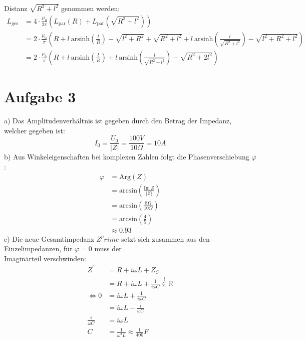 \documentclass[11pt a4paper]{article}
\newcommand{\arsinh}{\text{arsinh}}
\begin{document}
Distanz $\sqrt{R^2 + l^2}$ genommen werden:
\begin{align*}
	L_\text{ges} 
	&= 4 \cdot \frac{\mu_0}{2\pi}
		\left( L_\text{par} (R) + L_\text{par} \left( \sqrt{R^2 + l^2} \right) \right) \\
	&= 2 \cdot \frac{\mu_0}{\pi} \left( 
			R + l \ \arsinh \left(\frac{l}{R} \right) - \sqrt{l^2 + R^2} + 
			\sqrt{R^2 + l^2} + l \ \arsinh \left(\frac{l}{\sqrt{R^2 + l^2}} \right) 
			- \sqrt{l^2 + R^2 + l^2}
		\right) \\
	&= 2 \cdot \frac{\mu_0}{\pi} \left( 
			R + l \ \arsinh \left(\frac{l}{R} \right)
			  + l \ \arsinh \left(\frac{l}{\sqrt{R^2 + l^2}} \right) 
			- \sqrt{R^2 + 2l^2}
		\right)
\end{align*}

\newpage
\section*{Aufgabe 3}
a) Das Amplitudenverhältnis ist gegeben durch den Betrag der Impedanz, welcher gegeben ist:
\[ I_0 = \frac{U_0}{\vert Z \vert} = \frac{100V}{10\Omega} = 10 A \]
%
\vspace{0.5cm}
b) Aus Winkeleigenschaften bei komplexen Zahlen folgt die Phasenverschiebung $\varphi$:
\begin{align*}
	\varphi 
	&= \text{Arg} (Z) \\
	&= \text{arcsin} \left( \frac{ \text{Im} \ Z}{\vert Z \vert} \right) \\
	&= \text{arcsin} \left( \frac{8\Omega}{10\Omega} \right) \\
	&= \text{arcsin} \left( \frac45 \right) \\
	&\approx 0.93
\end{align*}
\vspace{0.5cm}
c) Die neue Gesamtimpedanz $Z^prime$ setzt sich zusammen aus den Einzelimpedanzen, für $\varphi = 0$ muss 
der \\ Imaginärteil verschwinden:
\begin{align*}
	Z^\prime
	&= R + i\omega L + Z_C \\
	&= R + i\omega L + \frac1{i\omega C} \overset{!}{\in} \mathbb{R} \\
	\Leftrightarrow
	0
	&= i\omega L + \frac1{i\omega C} \\
	&= i\omega L - \frac{i}{\omega C} \\
	\frac{i}{\omega C}
	&= i\omega L \\
	C 
	&= \frac{1}{\omega^2 L} \approx \frac1{400} F
\end{align*}
\end{document}
